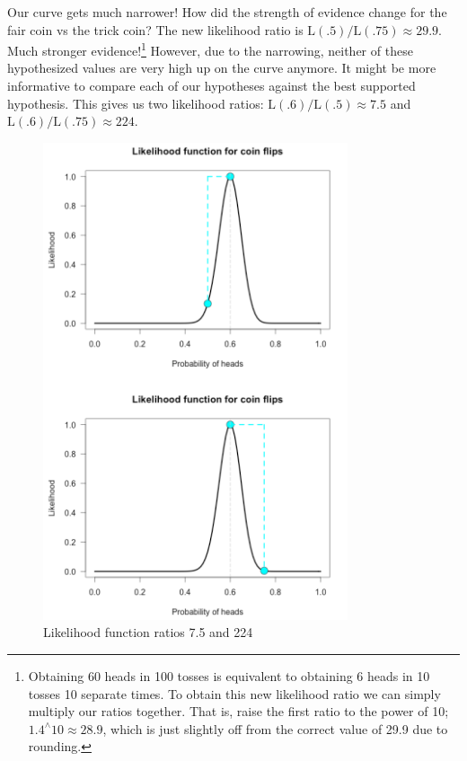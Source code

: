 Our curve gets much narrower! How did the strength of evidence change for the fair coin vs the trick coin? The new likelihood ratio is $\mathrm{L}(.5) / \mathrm{L}(.75) \approx 29.9$. Much stronger evidence!\footnote{Obtaining 60 heads in 100 tosses is equivalent to obtaining 6 heads in 10 tosses 10 separate times. To obtain this new likelihood ratio we can simply multiply our ratios together. That is, raise the first ratio to the power of 10; $1.4^{\wedge} 10 \approx 28.9$, which is just slightly off from the correct value of 29.9 due to rounding.} However, due to the narrowing, neither of these hypothesized values are very high up on the curve anymore. It might be more informative to compare each of our hypotheses against the best supported hypothesis. This gives us two likelihood ratios: $\mathrm{L}(.6) / \mathrm{L}(.5) \approx 7.5$  and $\mathrm{L}(.6) / \mathrm{L}(.75) \approx 224$.

\begin{figure}[h]
    \centering
\includegraphics[width=0.8\textwidth]{pic/p05c03-snip03.png}
    \caption{Likelihood function ratios 7.5 and 224}
    \label{fig:p05c03-snip03}
\end{figure}

